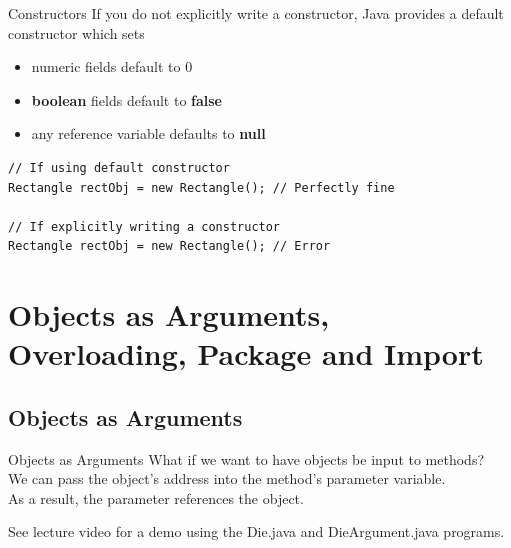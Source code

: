 \documentclass[11pt]{beamer}
\begin{document}
\begin{frame}[fragile]{Constructors}
    If you do not explicitly write a constructor, Java provides a default constructor which sets
    \begin{itemize}
        \item numeric fields default to 0
        \item \textbf{boolean} fields default to \textbf{false}
        \item any reference variable defaults to \textbf{null}        
    \end{itemize}
    \begin{lstlisting}
// If using default constructor
Rectangle rectObj = new Rectangle(); // Perfectly fine

// If explicitly writing a constructor
Rectangle rectObj = new Rectangle(); // Error
    \end{lstlisting}
\end{frame}

\section{Objects as Arguments, Overloading, Package and Import}
\subsection{Objects as Arguments}
\begin{frame}{Objects as Arguments}
What if we want to have objects be input to methods? \\ \vspace{1em}
We can pass the object’s address into the method’s parameter variable. \\ \vspace{1em}
As a result, the parameter references the object. \\ \vspace{1em}

See lecture video for a demo using the Die.java and DieArgument.java programs.
\end{frame}
\end{document}
